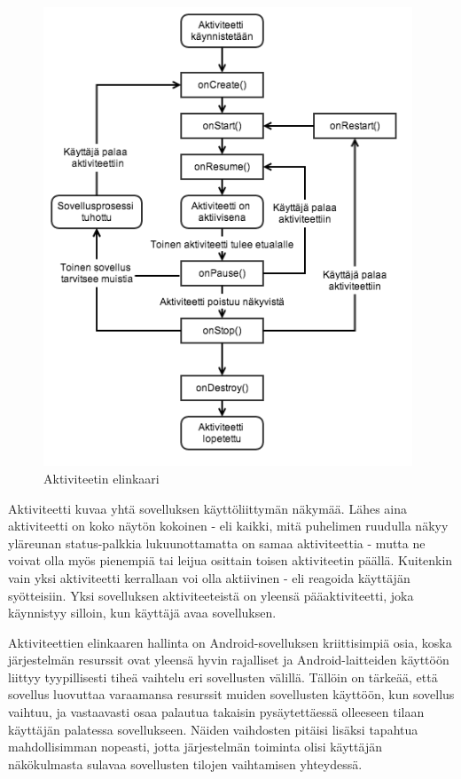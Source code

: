 \begin{figure}[h]
\centering
\includegraphics[width=110mm]{activity_lifecycle.png}
\caption{Aktiviteetin elinkaari \protect\cite{android}} \label{activity_lifecycle}
\end{figure}

Aktiviteetti kuvaa yhtä sovelluksen käyttöliittymän näkymää. Lähes aina aktiviteetti on koko näytön kokoinen - eli kaikki, mitä puhelimen ruudulla näkyy yläreunan status-palkkia lukuunottamatta on samaa aktiviteettia - mutta ne voivat olla myös pienempiä tai leijua osittain toisen aktiviteetin päällä. Kuitenkin vain yksi aktiviteetti kerrallaan voi olla aktiivinen - eli reagoida käyttäjän syötteisiin. Yksi sovelluksen aktiviteeteistä on yleensä pääaktiviteetti, joka käynnistyy silloin, kun käyttäjä avaa sovelluksen. 

Aktiviteettien elinkaaren hallinta on Android-sovelluksen kriittisimpiä osia, koska järjestelmän resurssit ovat yleensä hyvin rajalliset ja Android-laitteiden käyttöön liittyy tyypillisesti tiheä vaihtelu eri sovellusten välillä. Tällöin on tärkeää, että sovellus luovuttaa varaamansa resurssit muiden sovellusten käyttöön, kun sovellus vaihtuu, ja vastaavasti osaa palautua takaisin pysäytettäessä olleeseen tilaan käyttäjän palatessa sovellukseen. Näiden vaihdosten pitäisi lisäksi tapahtua mahdollisimman nopeasti, jotta järjestelmän toiminta olisi käyttäjän näkökulmasta sulavaa sovellusten tilojen vaihtamisen yhteydessä.

